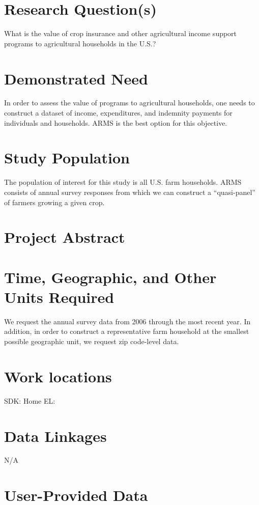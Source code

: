 \documentclass{article}
\begin{document}
\section*{Research Question(s)} 
What is the value of crop insurance and other agricultural income support programs to agricultural households in the U.S.? 

\section*{Demonstrated Need}
In order to assess the value of programs to agricultural households, one needs to construct a dataset of income, expenditures, and indemnity 
payments for individuals and households. ARMS is the best option for this objective.  

\section*{Study Population}
The population of interest for this study is all U.S. farm households. ARMS consists of annual survey responses from which we can construct a ``quasi-panel'' of farmers 
growing a given crop. 


\section*{Project Abstract}


\section*{Time, Geographic, and Other Units Required} 
We request the annual survey data from 2006 through the most recent year. In addition, in order to construct a representative farm household at the smallest possible geographic unit, 
we request zip code-level data. 

\section*{Work locations}
SDK: Home 
EL: 

\section*{Data Linkages}
N/A

\section*{User-Provided Data} 
\end{document}
